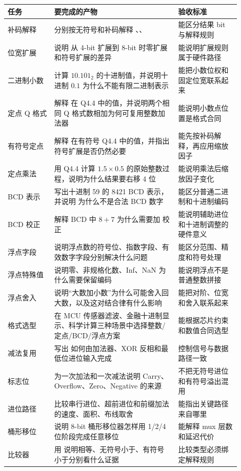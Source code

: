 \begin{longtable}{L{0.18\linewidth}L{0.48\linewidth}L{0.24\linewidth}}
\toprule
任务 & 要完成的产物 & 验收标准 \\
\midrule
补码解释 & 分别按无符号和补码解释 、、 & 能区分结果 bit 与解释规则 \\
位宽扩展 & 说明  从 4-bit 扩展到 8-bit 时零扩展和符号扩展的差异 & 能说明扩展规则属于硬件路径 \\
二进制小数 & 计算 $10.101_2$ 的十进制值，并说明十进制 $0.1$ 为什么不能有限二进制表示 & 能把小数位权和固定位宽联系起来 \\
定点 Q 格式 & 解释  在 Q4.4 中的值，并说明两个相同 Q 格式数相加为何可复用整数加法器 & 能说明小数点位置是格式合同 \\
有符号定点 & 解释  在有符号 Q4.4 中的值，并指出符号扩展是否仍然必要 & 能先按补码解释，再应用缩放因子 \\
定点乘法 & 用 Q4.4 计算 $1.5 \times 0.5$ 的原始整数过程，说明为什么结果要右移 4 位 & 能说明乘法后缩放因子变化 \\
BCD 表示 & 写出十进制 59 的 8421 BCD 表示，并说明  为什么不是合法 BCD 数字 & 能区分普通二进制和十进制编码 \\
BCD 校正 & 解释 BCD 中 $8+7$ 为什么需要加  校正 & 能说明辅助进位和十进制调整的硬件意义 \\
浮点字段 & 说明浮点数的符号位、指数字段、有效数字字段分别解决什么问题 & 能区分范围、精度和符号处理 \\
浮点特殊值 & 说明零、非规格化数、Inf、NaN 为什么需要保留编码 & 能说明浮点不是普通整数拼接 \\
浮点舍入 & 说明“大数加小数”为什么可能舍入回大数，以及这对结合律有什么影响 & 能把对阶、位宽和舍入联系起来 \\
格式选型 & 在 MCU 传感器滤波、金融十进制显示、科学计算三种场景中选择整数/定点/BCD/浮点方案 & 能根据芯片约束和数值合同选型 \\
减法复用 & 写出  如何由加法器、XOR 反相和最低位进位输入完成 & 控制信号与数据路径一致 \\
标志位 & 为一次加法和一次减法说明 Carry、Overflow、Zero、Negative 的来源 & 不把无符号进位和有符号溢出混用 \\
进位路径 & 比较串行进位、超前进位和前缀加法的速度、面积、布线取舍 & 能指出关键路径来自哪里 \\
桶形移位 & 说明 8-bit 桶形移位器怎样用 1/2/4 位阶段完成任意移位 & 能解释 mux 层数和延迟代价 \\
比较器 & 用  说明相等、无符号小于、有符号小于分别看什么证据 & 比较类型必须绑定解释规则 \\

\end{longtable}

